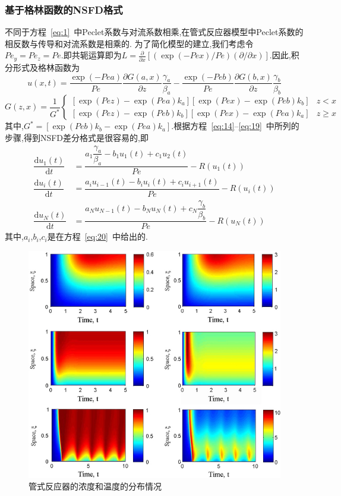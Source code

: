 \documentclass[a4paper,cs4size,adobefonts,cm-default,no-math]{ctexart}
\newcommand{\dif}{\mathrm{d}}
\begin{document}
\subsubsection{基于格林函数的NSFD格式}
不同于方程~\ref{eq:1}~中Peclet系数与对流系数相乘,在管式反应器模型中Peclet系数的相反数与传导和对流系数是相乘的.
为了简化模型的建立,我们考虑令$Pe_y=Pe_z=Pe$.即共轭运算即为$L=\frac{\partial}{\partial x}[(\exp(-Pex)/Pe)(\partial
/\partial x)]$.因此,积分形式及格林函数为
\begin{equation}
 u(x,t)=\dfrac{\exp(-Pea)}{Pe}\dfrac{\partial G(a,x)}{\partial z}\dfrac{\gamma_a}{\beta_a}-
        \dfrac{\exp(-Peb)}{Pe}\dfrac{\partial G(b,x)}{\partial z}\dfrac{\gamma_b}{\beta_b}
\end{equation}
\begin{equation}
G(z,x)=\dfrac{1}{G^*}\begin{cases}
        [\exp(Pez)-\exp(Pea)k_a][\exp(Pex)-\exp(Peb)k_b]	&	z<x	\\
        [\exp(Pez)-\exp(Peb)k_b][\exp(Pex)-\exp(Pea)k_a]	&	z\geq x	
       \end{cases}
\end{equation}
其中,$G^*=[\exp(Peb)k_b-\exp(Pea)k_a]$.根据方程~\ref{eq:14}--\ref{eq:19}~中所列的步骤,得到NSFD差分格式是很容易的,即
\begin{equation}
 \begin{aligned}
  \dfrac{\dif u_1(t)}{\dif t} &= \dfrac{a_1\dfrac{\gamma_a}{\beta_a}-b_1 u_1(t)+c_1 u_2(t)}{Pe}-R(u_1(t))\\
  \dfrac{\dif u_i(t)}{\dif t} &= \dfrac{a_iu_{i-1}(t)-b_iu_i(t)+c_iu_{i+1}(t)}{Pe}-R(u_i(t))\\
  \dfrac{\dif u_N(t)}{\dif t} &= \dfrac{a_Nu_{N-1}(t)-b_Nu_N(t)+c_N\dfrac{\gamma_b}{\beta_b}}{Pe}-R(u_N(t))
 \end{aligned}
\end{equation}
其中,$a_i$,$b_i$,$c_i$是在方程~\ref{eq:20}~中给出的.
\begin{figure}
\centering
\includegraphics[scale=0.7]{./pic/f5.jpg}
\caption{管式反应器的浓度和温度的分布情况}\label{fig:5}
\end{figure}
\end{document}
